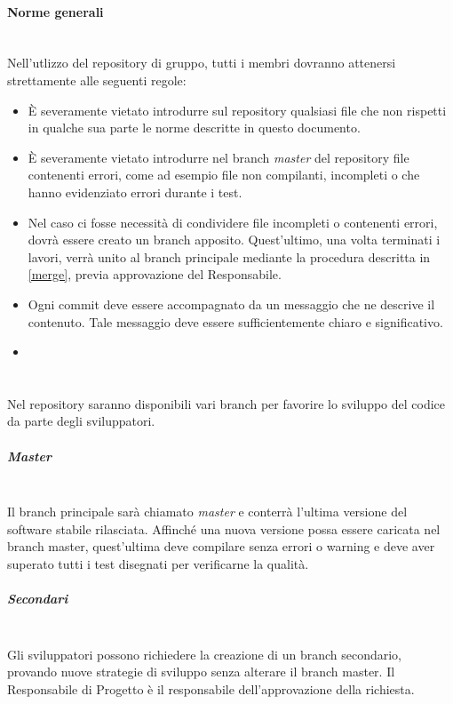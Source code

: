 \paragraph{Norme generali} \hfill \\
Nell'utlizzo del repository di gruppo, tutti i membri dovranno attenersi strettamente alle seguenti regole:
\begin{itemize}
\item \`{E} severamente vietato introdurre sul repository qualsiasi file che non rispetti in qualche sua parte le norme descritte in questo documento.
\item \`{E} severamente vietato introdurre nel branch \textit{master} del repository file contenenti errori, come ad esempio file non compilanti, incompleti o che hanno evidenziato errori durante i test.
\item Nel caso ci fosse necessità di condividere file incompleti o contenenti errori, dovrà essere creato un branch apposito. Quest'ultimo, una volta terminati i lavori, verrà unito al branch principale mediante la procedura descritta in \ref{merge}, previa approvazione del Responsabile.
\item Ogni commit deve essere accompagnato da un messaggio che ne descrive il contenuto. Tale messaggio deve essere sufficientemente chiaro e significativo.
\item 
\end{itemize}


\paragraph{} \hfill \\
\label{4.4}
Nel repository saranno disponibili vari branch per favorire lo sviluppo del codice da parte degli sviluppatori.

\subparagraph{Master} \hfill \\
\label{4.4.1}
Il branch principale sarà chiamato \textit{master} e conterrà l'ultima versione del software stabile rilasciata. Affinché una nuova versione possa essere caricata nel branch master, quest'ultima deve compilare senza errori o warning e deve aver superato tutti i test disegnati per verificarne la qualità.

\subparagraph{Secondari} \hfill \\
\label{4.4.2}
Gli sviluppatori possono richiedere la creazione di un branch secondario, provando nuove strategie di sviluppo senza alterare il branch master. Il Responsabile di Progetto è il responsabile dell'approvazione della richiesta.

